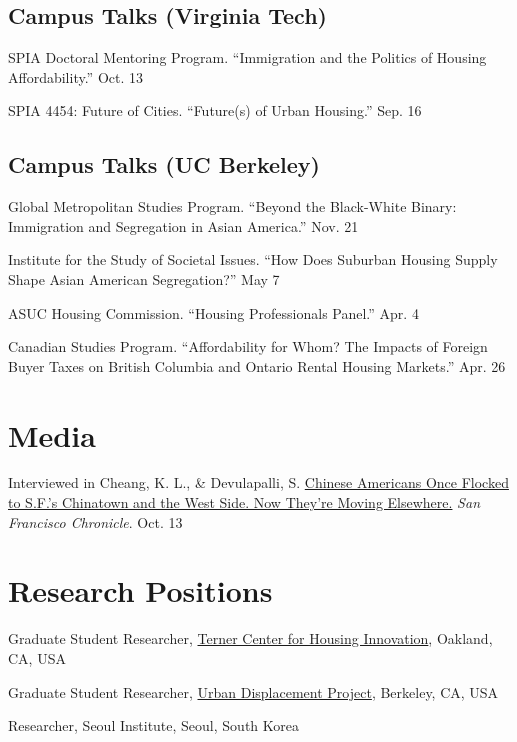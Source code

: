 \documentclass[11pt,letterpaper]{article}
\begin{document}
\subsection{Campus Talks (Virginia Tech)}
\begin{tablist}
  \item[2026] \tab{}SPIA Doctoral Mentoring Program. ``Immigration and the Politics of Housing Affordability.'' Oct. 13
  \item[2026] \tab{}SPIA 4454: Future of Cities. ``Future(s) of Urban Housing.'' Sep. 16
\end{tablist}

\subsection{Campus Talks (UC Berkeley)} 
\begin{tablist}
  \item[2025] \tab{}Global Metropolitan Studies Program. ``Beyond the Black-White Binary: Immigration and Segregation in Asian America.'' Nov. 21
  \item[2025] \tab{}Institute for the Study of Societal Issues. ``How Does Suburban Housing Supply Shape Asian American Segregation?'' May 7
  \item[2024] \tab{}ASUC Housing Commission. ``Housing Professionals Panel.'' Apr. 4
  \item[2023] \tab{}Canadian Studies Program. ``Affordability for Whom? The Impacts of Foreign Buyer Taxes on British Columbia and Ontario Rental Housing Markets.'' Apr. 26
\end{tablist}

\section{Media}
\begin{tablist}
  \item[2026] \tab{}Interviewed in Cheang, K. L., \& Devulapalli, S. \href{https://www.sfchronicle.com/sf/article/chinese-americans-san-francisco-neighborhoods-22458761.php}{Chinese Americans Once Flocked to S.F.'s Chinatown and the West Side. Now They're Moving Elsewhere.} \emph{San Francisco Chronicle}. Oct. 13
\end{tablist}

\section{Research Positions}
\begin{tablist}
  \item[2023--26] \tab{}Graduate Student Researcher, \href{https://ternercenter.berkeley.edu/}{Terner Center for Housing Innovation}, Oakland, CA, USA
  \item[2021--23] \tab{}Graduate Student Researcher, \href{https://www.urbandisplacement.org/}{Urban Displacement Project}, Berkeley, CA, USA
  \item[2019--21] \tab{}Researcher, Seoul Institute, Seoul, South Korea
\end{tablist}
\end{document}
